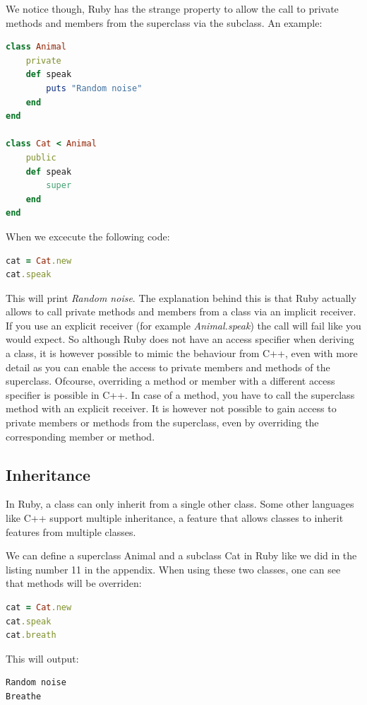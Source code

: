 \documentclass[10pt,a4paper,twocolumn]{article}
\begin{document}
We notice though, Ruby has the strange property to allow the call to private methods and members from the superclass via the subclass. An example:

\begin{lstlisting}[language=Ruby]
class Animal
	private
	def speak
		puts "Random noise"
	end
end

class Cat < Animal
	public
	def speak
		super
	end
end
\end{lstlisting}

When we excecute the following code:

\begin{lstlisting}[language=Ruby]
cat = Cat.new
cat.speak
\end{lstlisting}

This will print \textit{Random noise}. The explanation behind this is that Ruby actually allows to call private methods and members from a class via an implicit receiver. If you use an explicit receiver (for example \textit{Animal.speak}) the call will fail like you would expect. So although Ruby does not have an access specifier when deriving a class, it is however possible to mimic the behaviour from C++, even with more detail as you can enable the access to private members and methods of the superclass. Ofcourse, overriding a method or member with a different access specifier is possible in C++. In case of a method, you have to call the superclass method with an explicit receiver. It is however not possible to gain access to private members or methods from the superclass, even by overriding the corresponding member or method.

\subsection{Inheritance}
In Ruby, a class can only inherit from a single other class. Some other languages like C++ support multiple inheritance, a feature that allows classes to inherit features from multiple classes.

We can define a superclass Animal and a subclass Cat in Ruby like we did in the listing number 11 in the appendix. When using these two classes, one can see that methods will be overriden:

\begin{lstlisting}[language=Ruby]
cat = Cat.new
cat.speak
cat.breath
\end{lstlisting}

This will output:

\begin{lstlisting}
Random noise
Breathe
\end{lstlisting}
\end{document}
